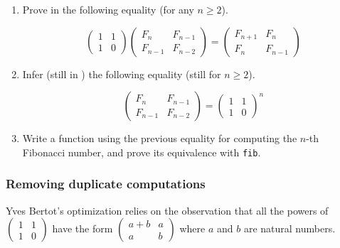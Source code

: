 \begin{exercise}
  \begin{enumerate}
  \item 

Prove in \coq{} the following equality (for any $n\geq 2$). \label{fibmat-eq1}

\[
\left(
  \begin{array}{cc}
    1 & 1 \\
    1 & 0 
  \end{array}
\right)
\left(
  \begin{array}{cc}
    F_{n}& F_{n-1} \\
    F_{n-1} & F_{n-2}
  \end{array}
\right)
=
\left(
  \begin{array}{cc}
    F_{n+1}& F_{n} \\
    F_{n} & F_{n-1} 
  \end{array}
\right)
\]
  
\item Infer (still in \coq{}) the following equality (still for $n\geq 2$).



\[
\left(
  \begin{array}{cc}
    F_{n}& F_{n-1} \\
    F_{n-1} & F_{n-2} 
  \end{array}
\right)
= 
\left(
  \begin{array}{cc}
    1 & 1 \\
    1 & 0 
  \end{array}
\right)^n
\]

\item Write a function using the previous equality for computing the $n$-th Fibonacci number, and prove its equivalence with \texttt{fib}.

\end{enumerate}
\end{exercise}

\subsubsection{Removing duplicate computations}
\label{sect:fibonacci-mul2}


Yves Bertot's optimization relies on the observation that all the powers of
\(  \left(
  \begin{array}{cc}
    1 & 1 \\
    1 & 0 
  \end{array}
\right) \) have the form 
\(  \left(
  \begin{array}{cc}
    a+b  & a \\
    a & b
  \end{array}
\right) \) where $a$ and $b$ are natural numbers.

